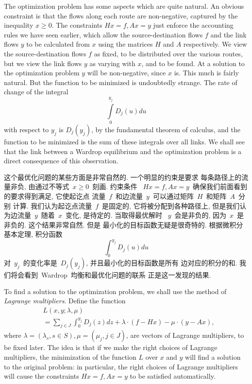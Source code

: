 \documentclass[a4paper,12pt, twocolumn]{article}
\begin{document}
The optimization problem has some aspects which are
quite natural. An obvious constraint is that the 
flows along each route are non-negative, captured
by the inequality $x \geq 0$. The constraints
$H x =f, A x =y$ just enforce the accounting rules
we have seen earlier, which allow the source-destination
flows $f$ and the link flows $y$ to be calculated from $x$
using the matrices $H$ and $A$ respectively. We view
the source-destination flows $f$ as fixed, to be distributed
over the various routes, but we view the link flows $y$
as varying with $x$, and to be found. 
At a solution to the optimization problem 
$y$ will be non-negative, since $x$ is.  This much
is fairly natural. But the function 
to be minimized is undoubtedly strange. 
The rate of change of the integral 
$$\int\limits_0^{y_j} D_j(u)du$$
with respect to $y_j$ 
is $D_j(y_j)$, by the fundamental theorem
of calculus, and the function to be minimized is the sum of
these integrals over all links. We shall see  
that the
link between a Wardrop equilibrium and the optimization problem 
is a direct consequence of this observation.  

这个最优化问题的某些方面是非常自然的. 一个明显的约束是要求
每条路径上的流量非负, 由通过不等式~$x \geq 0$~刻画. 约束条件
~$H x =f, A x =y$~确保我们前面看到的要求得到满足, 它使起讫点
流量~$f$~和边流量~$y$~可以通过矩阵~$H$~和矩阵~$A$~分别
计算. 我们认为起讫点流量~$f$~是固定的, 它将被分配到各种路径上, 
但是我们认为边流量~$y$~随着~$x$~变化, 是待定的. 当取得最优解时
~$y$~会是非负的, 因为~$x$~是非负的. 这个结果非常自然. 但是
最小化的目标函数无疑是很奇特的. 根据微积分基本定理, 积分函数
$$\int_0^{y_j} D_j(u)du$$
对~$y_{j}$~的变化率是~$D_j(y_j)$, 并且最小化的目标函数是所有
边对应的积分的和. 我们将会看到~Wardrop~均衡和最优化问题的联系
正是这一发现的结果. 

To find a solution to the optimization problem,
we shall use the method of {\it Lagrange
multipliers}. Define the function
\begin{align*}
&L(x ,y ;\lambda ,\mu )   \\
&=\sum_{j\in J}\int_0^{y_j} 
D_j (z)dz+\lambda \cdot (f-H x)-\mu \cdot (y -A x ),
\end{align*}
where $\lambda =(\lambda_s, s \in S), \mu =(\mu_j, j \in J)$,
are vectors of Lagrange multipliers, to be fixed later. 
The idea is that if we make the right choices of Lagrange
multipliers, the minimization of the function $L$
over $x$ and $y$ will find a solution to the original
problem: in particular, the right choices of Lagrange
multipliers will cause  
the constraints $H x =f, A x =y$ to be satisfied automatically.
\end{document}
